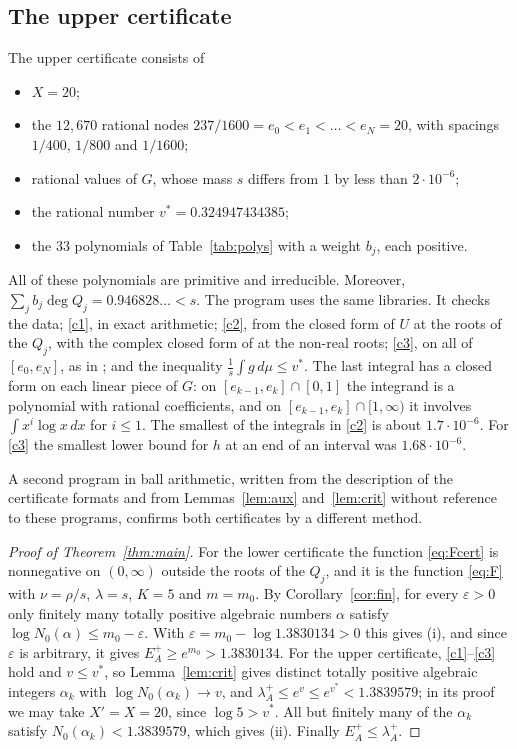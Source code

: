 \documentclass[11pt]{amsart}
\theoremstyle{remark}
\numberwithin{equation}{section}
\newcommand{\LB}{1.3830134}
\newcommand{\UB}{1.3839579}
\newcommand{\vDec}{0.324947434385}
\newcommand{\Kconst}{5}
\newcommand{\eNUp}{20}
\newcommand{\Xval}{20}
\newcommand{\NPolyUp}{33}
\newcommand{\NNodesUp}{12{,}670}
\newcommand{\eZeroUp}{237/1600}
\newcommand{\MassDevUp}{2\cdot10^{-6}}
\newcommand{\BudgetUp}{0.946828}
\newcommand{\MinIntLog}{1.7\cdot10^{-6}}
\newcommand{\MinEndUp}{1.68\cdot10^{-6}}
\begin{document}
\subsection{The upper certificate}
The upper certificate consists of
\begin{itemize}[leftmargin=1.5em]
\item $X=\Xval$;
\item the $\NNodesUp$ rational nodes $\eZeroUp=e_0<e_1<\dots<e_N=\eNUp$, with spacings $1/400$, $1/800$ and $1/1600$;
\item rational values of $G$, whose mass $s$ differs from $1$ by less than $\MassDevUp$;
\item the rational number $v^*=\vDec$;
\item the $\NPolyUp$ polynomials of Table~\ref{tab:polys} with a weight $b_j$, each positive.
\end{itemize}
All of these polynomials are primitive and irreducible. Moreover, $\sum_jb_j\deg Q_j=\BudgetUp\ldots<s$. The program uses the same libraries. It checks the data; \ref{c1}, in exact arithmetic; \ref{c2}, from the closed form of $U$ at the roots of the $Q_j$, with the complex closed form of \cite[Section~3.2]{Tom26b} at the non-real roots; \ref{c3}, on all of $[e_0,e_N]$, as in \cite[Section~3.2]{Tom26b}; and the inequality $\frac1s\int g\,d\mu\le v^*$. The last integral has a closed form on each linear piece of $G$: on $[e_{k-1},e_k]\cap[0,1]$ the integrand is a polynomial with rational coefficients, and on $[e_{k-1},e_k]\cap[1,\infty)$ it involves $\int x^i\log x\,dx$ for $i\le1$. The smallest of the integrals in \ref{c2} is about $\MinIntLog$. For \ref{c3} the smallest lower bound for $h$ at an end of an interval was $\MinEndUp$.

A second program in ball arithmetic, written from the description of the certificate formats and from Lemmas~\ref{lem:aux} and~\ref{lem:crit} without reference to these programs, confirms both certificates by a different method.

\begin{proof}[Proof of Theorem~\ref{thm:main}]
For the lower certificate the function \eqref{eq:Fcert} is nonnegative on $(0,\infty)$ outside the roots of the $Q_j$, and it is the function \eqref{eq:F} with $\nu=\rho/s$, $\lambda=s$, $K=\Kconst$ and $m=m_0$. By Corollary~\ref{cor:fin}, for every $\varepsilon>0$ only finitely many totally positive algebraic numbers $\alpha$ satisfy $\log N_0(\alpha)\le m_0-\varepsilon$. With $\varepsilon=m_0-\log\LB>0$ this gives (i), and since $\varepsilon$ is arbitrary, it gives $E_A^+\ge e^{m_0}>\LB$. For the upper certificate, \ref{c1}--\ref{c3} hold and $v\le v^*$, so Lemma~\ref{lem:crit} gives distinct totally positive algebraic integers $\alpha_k$ with $\log N_0(\alpha_k)\to v$, and $\lambda_A^+\le e^v\le e^{v^*}<\UB$; in its proof we may take $X'=X=20$, since $\log5>v^*$. All but finitely many of the $\alpha_k$ satisfy $N_0(\alpha_k)<\UB$, which gives (ii). Finally $E_A^+\le\lambda_A^+$.
\end{proof}
\end{document}
